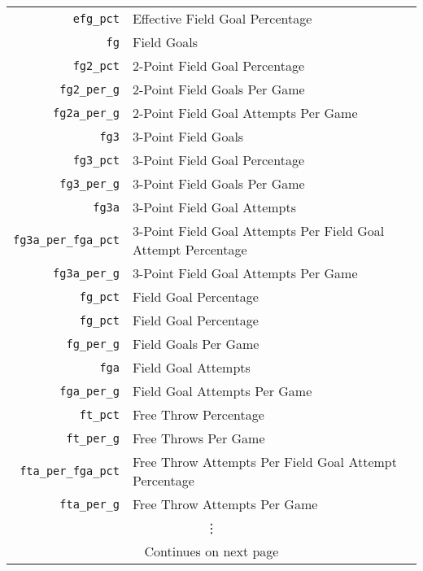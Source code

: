 \begin{table}[H]
\begin{tabular}{rl}
    \texttt{efg\_pct}            & Effective Field Goal Percentage                               \\
    \texttt{fg}                  & Field Goals                                                   \\
    \texttt{fg2\_pct}            & 2-Point Field Goal Percentage                                 \\
    \texttt{fg2\_per\_g}         & 2-Point Field Goals Per Game                                  \\
    \texttt{fg2a\_per\_g}        & 2-Point Field Goal Attempts Per Game                          \\
    \texttt{fg3}                 & 3-Point Field Goals                                           \\
    \texttt{fg3\_pct}            & 3-Point Field Goal Percentage                                 \\
    \texttt{fg3\_per\_g}         & 3-Point Field Goals Per Game                                  \\
    \texttt{fg3a}                & 3-Point Field Goal Attempts                                   \\
    \texttt{fg3a\_per\_fga\_pct} & 3-Point Field Goal Attempts Per Field Goal Attempt Percentage \\
    \texttt{fg3a\_per\_g}        & 3-Point Field Goal Attempts Per Game                          \\
    \texttt{fg\_pct}             & Field Goal Percentage                                         \\
    \texttt{fg\_pct}             & Field Goal Percentage                                         \\
    \texttt{fg\_per\_g}          & Field Goals Per Game                                          \\
    \texttt{fga}                 & Field Goal Attempts                                           \\
    \texttt{fga\_per\_g}         & Field Goal Attempts Per Game                                  \\
    \texttt{ft\_pct}             & Free Throw Percentage                                         \\
    \texttt{ft\_per\_g}          & Free Throws Per Game                                          \\
    \texttt{fta\_per\_fga\_pct}  & Free Throw Attempts Per Field Goal Attempt Percentage         \\
    \texttt{fta\_per\_g}         & Free Throw Attempts Per Game                                  \\
    \multicolumn{2}{c}{\vdots} \\
  \midrule
    \multicolumn{2}{c}{Continues on next page} \\
  \bottomrule
\end{tabular}
\end{table}

